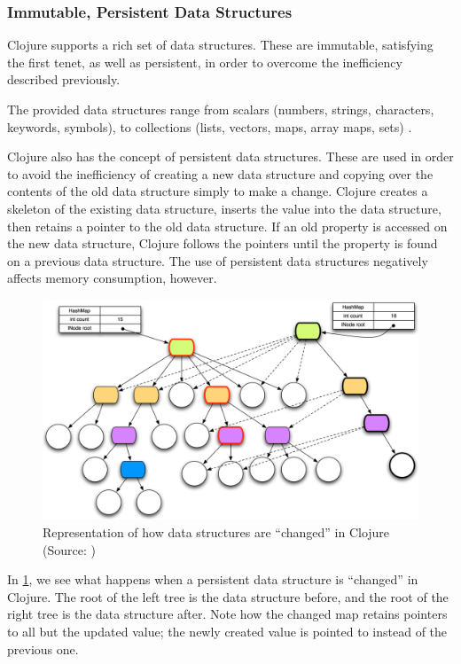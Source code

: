 		\subsubsection{Immutable, Persistent Data Structures}
			Clojure supports a rich set of data structures.  These are immutable, satisfying the first tenet, as well as persistent, in order to overcome the inefficiency described previously.
			
			The provided data structures range from scalars (numbers, strings, characters, keywords, symbols), to collections (lists, vectors, maps, array maps, sets) \cite{clj-data-structures}.
			
			Clojure also has the concept of persistent data structures.  These are used in order to avoid the inefficiency of creating a new data structure and copying over the contents of the old data structure simply to make a change.  Clojure creates a skeleton of the existing data structure, inserts the value into the data structure, then retains a pointer to the old data structure.  If an old property is accessed on the new data structure, Clojure follows the pointers until the property is found on a previous data structure.  The use of persistent data structures negatively affects memory consumption, however.
			
			\begin{figure}
				\centering
				
				\includegraphics[scale=0.42]{figures/diagrams/persistent-data-structure}
				
				\caption{Representation of how data structures are ``changed'' in Clojure (Source:  \cite{clj-persistent})}
				\label{fig:persistent-data-structure}
			\end{figure}
			
			In \cref{fig:persistent-data-structure}, we see what happens when a persistent data structure is ``changed'' in Clojure.  The root of the left tree is the data structure before, and the root of the right tree is the data structure after.  Note how the changed map retains pointers to all but the updated value; the newly created value is pointed to instead of the previous one.
		
